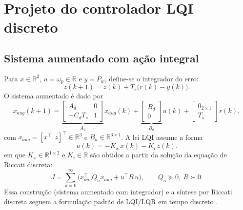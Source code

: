 \section{Projeto do controlador LQI discreto}
\label{sec:controle-lqi-discreto}
\subsection{Sistema aumentado com ação integral}
\label{sec:lqi-mimo}
Para $x\in\mathbb{R}^2$, $u=\omega_p\in\mathbb{R}$ e $y=P_w$, define-se o integrador do erro:
\[
    z(k+1)=z(k)+T_s\big(r(k)-y(k)\big).
\]
O sistema aumentado é dado por
\[
    x_{aug}(k+1)=
    \underbrace{\begin{bmatrix}
            A_d      & 0 \\
            -C_d T_s & 1
        \end{bmatrix}}_{A_a}
    x_{aug}(k)
    +
    \underbrace{\begin{bmatrix}
            B_d \\
            0
        \end{bmatrix}}_{B_a}
    u(k)
    +
    \begin{bmatrix}
        0_{2\times 1} \\
        T_s
    \end{bmatrix}r(k),
\]
com $x_{aug}=[x^\top\ \ z]^\top\in\mathbb{R}^3$ e $B_a\in\mathbb{R}^{3\times 1}$. A lei LQI assume a forma
\[
    u(k)=-K_x\,x(k)-K_i\,z(k).
\]
em que $K_x\in\mathbb{R}^{1\times 2}$ e $K_i\in\mathbb{R}$ são obtidos a partir da solução da equação de Riccati discreta:
\[
    J=\sum_{k=0}^{\infty}\big(x_{aug}^\top Q_a x_{aug}+u^\top R\,u\big),\qquad
    Q_a\succeq 0,\ R\succ 0.
\]
Essa construção (sistema aumentado com integrador) e a síntese por Riccati discreta seguem a formulação padrão de LQI/LQR em tempo discreto \cite{FranklinPowellWorkman1998,Ogata1997,BrunoAAngelico2018}.
